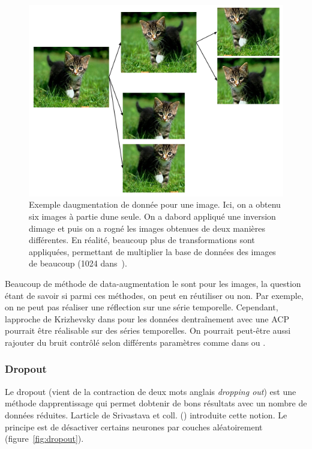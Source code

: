 \documentclass[11pt]{sdm}
\begin{document}
			\begin{figure}[!ht]
				\centering
				\includegraphics[scale=0.6,natwidth=528,natheight=397]{figures/dataAugmentationImage.png}
				\caption{Exemple d\textquotesingle augmentation de donn\'ee pour une image. Ici, on a obtenu six images \`a partie d\textquotesingle une seule. On a d\textquotesingle abord appliqu\'e une inversion d\textquotesingle image et puis on a rogn\'e les images obtenues de deux mani\`eres diff\'erentes. En r\'ealit\'e, beaucoup plus de transformations sont appliqu\'ees, permettant de multiplier la base de donn\'ees des images de beaucoup (1024 dans~\cite{howard2013some}).}
				\label{fig:dataAugmentationChat}
			\end{figure}

			Beaucoup de m\'ethode de data-augmentation le sont pour les images, la question \'etant de savoir si parmi ces m\'ethodes, on peut en r\'eutiliser ou non. Par exemple, on ne peut pas r\'ealiser une r\'eflection sur une s\'erie temporelle. Cependant, l\textquotesingle approche de Krizhevsky dans \cite{krizhevsky2012imagenet} pour les donn\'ees d\textquotesingle entra\^inement avec une ACP pourrait \^etre r\'ealisable sur des s\'eries temporelles. On pourrait peut-\^etre aussi rajouter du bruit contr\^ol\'e selon diff\'erents param\`etres comme dans \cite{krizhevsky2012imagenet} ou \cite{howard2013some}.

		\subsubsection{Dropout}
			Le dropout (vient de la contraction de deux mots anglais \textit{dropping out}) est une m\'ethode d\textquotesingle apprentissage qui permet d\textquotesingle obtenir de bons r\'esultats avec un nombre de donn\'ees r\'eduites. L\textquotesingle article de Srivastava et coll. (\cite{srivastava2014dropout}) introduite cette notion. Le principe est de d\'esactiver certains neurones par couches al\'eatoirement (figure~\ref{fig:dropout}).
\end{document}
